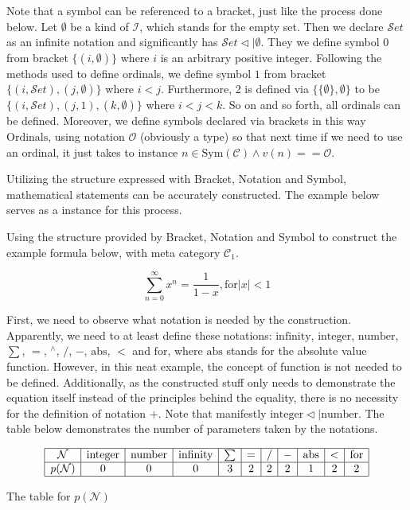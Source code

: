 \documentclass{article}
\begin{document}
Note that a symbol can be referenced to a bracket, just like the process done below. Let \(\emptyset\) be a kind of \(\mathcal{I}\), which stands for the empty set. Then we declare \(\mathcal{S}\mathit{e}\mathit{t}\) as an infinite notation and significantly has \(\mathcal{S}\mathit{e}\mathit{t}\triangleleft |\emptyset\). They we define symbol \(0\) from bracket \(\{(i,\emptyset )\}\) where \(i\) is an arbitrary positive integer. Following the methods used to define ordinals, we define symbol \(1\) from bracket \(\{(i,\mathcal{S}\mathit{e}\mathit{t}),(j,\emptyset )\}\) where \(i<j\). Furthermore, 2 is defined via \(\{\{\emptyset \},\emptyset \}\) to be \(\{(i,\mathcal{S}\mathit{e}\mathit{t}),(j,1),(k,\emptyset )\}\) where \(i<j<k\). So on and so forth, all ordinals can be defined. Moreover, we define symbols declared via brackets in this way \(\text{Ordinals}\), using notation \(\mathcal{O}\) (obviously a type) so that next time if we need to use an ordinal, it just takes to instance \(n\in \text{Sym}(\mathcal{C})\land \mathit{v}(n)==\mathcal{O}\).

Utilizing the structure expressed with Bracket, Notation and Symbol, mathematical statements can be accurately constructed. The example below serves as a instance for this process.

 Using the structure provided by Bracket, Notation and Symbol to construct the example formula below, with meta category \(\mathcal{C}_1\).

\[\sum _{n=0}^{\infty } x^n=\frac{1}{1-x}, \text{for} |x|<1\]

First, we need to observe what notation is needed by the construction. Apparently, we need to at least define these notations: \(\text{infinity}\), \(\text{integer}\), \(\text{number}\),\textit{  }\textit{ \(\sum\)}, \(=\), \({}^{\wedge}\), \(/\), \(-\), \(\text{abs}\), \(<\) and \(\text{for}\), where \(\text{abs}\) stands for the absolute value function. However, in this neat example, the concept of function is not needed to be defined. Additionally, as the constructed stuff only needs to demonstrate the equation itself instead of the principles behind the equality, there is no necessity for the definition of notation \(+\). Note that manifestly \(\text{integer} \triangleleft | \text{number}\). The table below demonstrates the number of parameters taken by the notations.



\begin{table}
	\centering
	\[\begin{array}{|c|c|c|c|c|c|c|c|c|c|c|}
		\hline
		\mathcal{N} & \text{integer} & \text{number} & \text{infinity} & \sum  & = & / & - & \text{abs} & < & \text{for} \\
		\hline
		\mathit{p}(\mathcal{N}) & 0 & 0 & 0 & 3 & 2 & 2 & 2 & 1 & 2 & 2 \\
		\hline
	\end{array}\]
	\caption{The table for $\mathit{p}(\mathcal{N})$}
\end{table}
\end{document}
